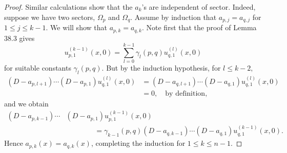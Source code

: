 \documentclass{surv-l}
\theoremstyle{plain}
\theoremstyle{definition}
\numberwithin{equation}{chapter}
\begin{document}
\begin{proof}
Similar calculations show that the $a_{k}$'s are independent of sector. Indeed, suppose we have two sectors, $\Omega_{p}$ and $\Omega_{q}$. Assume by induction that $a_{p,j}=a_{q,j}$ for $1\leq j\leq k-1$. We will show that $a_{p,k}=a_{q,k}$. Note first that the proof of Lemma 38.3 gives
\begin{equation*}
u_{p,1}^{(k-1)}(x, 0)=\sum_{l=0}^{k-1}\gamma_{l}(p, q)u_{q,1}^{(l)}(x, 0)
\end{equation*}
for suitable constants $\gamma_{l}(p, q)$. But by the induction hypothesis, for $l\leq k-2,$
\begin{align*}
(D-a_{p,l+1})\cdots(D-a_{p,1})u_{q,1}^{(l)}(x, 0)&= (D-a_{q,l+1})\cdots(D-a_{q,1})u_{q,1}^{(l)}(x, 0)\\
&=0,\quad \text{by definition},
\end{align*}
and we obtain
\begin{align*}
(D-a_{p,k-1})\cdots&(D-a_{p,1})u_{p,1}^{(k-1)}(x,0)\\
&\qquad \qquad=\gamma_{k-1}(p, q)(D-a_{q,k-1})\cdots(D-a_{q,1})u_{q,1}^{(k-1)}(x, 0).
\end{align*}
Hence $a_{p,k}(x)=a_{q,k}(x)$, completing the induction for $1\leq k\leq n-1$.


\end{proof}
\end{document}

